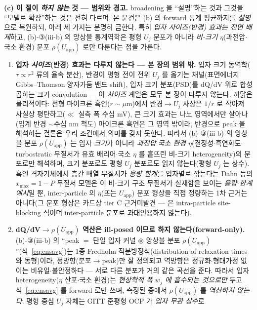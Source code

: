 \documentclass[11pt,a4paper]{article}
\newcommand{\app}{\mathrm{app}}
\begin{document}
\textbf{(c) 이 절이 \emph{하지 않는} 것 — 범위와 경고.} broadening 을 ``설명''하는 것과 그것을 ``모델로 확장''하는 것은
전혀 다르며, 본 문건은 (b) 의 forward 통계 평균까지를 \emph{설명}으로 복원하되, 아래 세 가지는 분명히 금한다. 특히
\emph{입자 사이즈(반경) 효과는 전면 배제}하고, (b)-③(iii-b) 의 앙상블 통계역학은 평형 $U_j$ 분포가 아니라 \emph{비-크기}
$\eta$(과전압$\cdot$국소 환경) 분포 $\rho(U_\app)$ 로만 다룬다는 점을 가른다.
\begin{enumerate}[label=(\roman*),leftmargin=2.2em,itemsep=2.5pt]
\item \textbf{입자 \emph{사이즈}(반경) 효과는 다루지 않는다 — 본 장의 범위 밖.} 입자 크기 동역학($\tau\!\propto\!r^2$
류의 율속 분산), 반경이 평형 전이 전위 $U_j$ 를 옮기는 채널(표면에너지 Gibbs--Thomson$\cdot$양자가둠 밴드 shift), 입자
크기 분포(PSD)를 dQ/dV 위로 합성곱하는 크기 convolution — 이 \emph{사이즈} 계열은 모두 본 장이 다루지 않는다. 까닭은
물리적이다: 전형 마이크론 흑연($r\!\sim\!\mu$m)에서 반경$\to U_j$ 사상은 $1/r$ 로 작아져 사실상 평탄하고($\ll$ 실측 폭
수십 mV), 큰 크기 효과는 나노 영역에서만 살아나(임계 반경 $\sim$수십 nm 척도) 마이크론 흑연은 그 영역 밖이라, 반경으로
peak 을 해석하는 결론은 우리 조건에서 의미를 갖지 못한다. 따라서 (b)-③(iii-b) 의 앙상블 분포 $\rho(U_\app)$ 는 입자
\emph{크기}가 아니라 \emph{과전압$\cdot$국소 환경 $\eta$}(결정성$\cdot$흑연화도$\cdot$turbostratic 무질서가 유효
배리어$\cdot$국소 $\eta$ 를 흩뜨린 비-크기 heterogeneity)의 분포로만 해석하며, 크기 분포로도 평형 $U_j$ 분포로도 읽지
않는다(평형 $U_j$ 는 상수). 흑연 격자기체에서 층간 배열 무질서가 \emph{용량 한계}를 입자별로 깎는다는 Dahn 등의
$x_{\max}=1-P$ 무질서 모델\cite{dahn1995}은 이 비-크기 구조 무질서가 실재함을 보이는 \emph{용량-한계 예시}일 뿐,
inter-particle 의 $\eta$(또는 $U_\app$) 분포 형상을 직접 정량하는 1차 근거는 아니다(그 분포 형상은 카드상 tier C
근거미발견 — \cite{dahn1995} 은 intra-particle site-blocking 식이며 inter-particle 분포로 과대인용하지 않는다).
\item \textbf{dQ/dV$\to\rho(U_\app)$ 역산은 ill-posed 이므로 하지 않는다(forward-only).} (b)-③(iii-b) 의 ``peak $=$
단일 입자 커널 $\circledast$ 앙상블 분포 $\rho(U_\app)$''(식~\eqref{eq:ensavg})는 1종 Fredholm 적분방정식(distribution
of relaxation times 와 동형)이라, 정방향(분포$\to$peak)만 잘 정의되고 역방향은 정규화$\cdot$형태가정 없이는
비유일$\cdot$불안정하다 — 서로 다른 분포가 거의 같은 곡선을 준다. 따라서 입자 heterogeneity($\eta$ 산포$\cdot$국소 환경)는
\emph{현상학적 폭 $w_j$ 에 흡수되는 것으로만} 두고 식~\eqref{eq:ensavg} 를 forward 로만 쓰며, 측정된 종에서
$\rho(U_\app)$ 를 \emph{역산하지 않는다}. 평형 중심 $U_j$ 자체는 GITT 준평형 OCP 가 \emph{입자 무관 상수}로

\end{enumerate}
\end{document}
